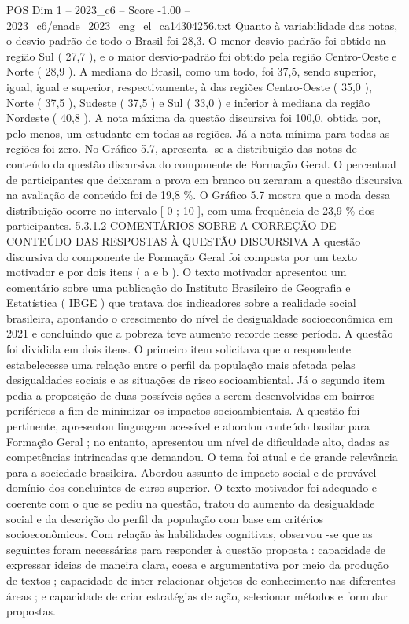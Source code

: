\begin{textsample}{POS Dim 1 – 2023\_c6 – Score -1.00 – 2023\_c6/enade\_2023\_eng\_el\_ca14304256.txt}
Quanto à variabilidade das notas, o desvio-padrão de todo o Brasil foi 28,3.
O menor desvio-padrão foi obtido na região Sul ( 27,7 ), e o maior desvio-padrão foi obtido pela região Centro-Oeste e Norte ( 28,9 ).
A mediana do Brasil, como um todo, foi 37,5, sendo superior, igual, igual e superior, respectivamente, à das regiões Centro-Oeste ( 35,0 ), Norte ( 37,5 ), Sudeste ( 37,5 ) e Sul ( 33,0 ) e inferior à mediana da região Nordeste ( 40,8 ).
A nota máxima da questão discursiva foi 100,0, obtida por, pelo menos, um estudante em todas as regiões.
Já a nota mínima para todas as regiões foi zero.
No Gráfico 5.7, apresenta -se a distribuição das notas de conteúdo da questão discursiva do componente de Formação Geral.
O percentual de participantes que deixaram a prova em branco ou zeraram a questão discursiva na avaliação de conteúdo foi de 19,8 \%.
O Gráfico 5.7 mostra que a moda dessa distribuição ocorre no intervalo [ 0 ; 10 ], com uma frequência de 23,9 \% dos participantes. 5.3.1.2 COMENTÁRIOS SOBRE A CORREÇÃO DE CONTEÚDO DAS RESPOSTAS À QUESTÃO DISCURSIVA A questão discursiva do componente de Formação Geral foi composta por um texto motivador e por dois itens ( a e b ).
O texto motivador apresentou um comentário sobre uma publicação do Instituto Brasileiro de Geografia e Estatística ( IBGE ) que tratava dos indicadores sobre a realidade social brasileira, apontando o crescimento do nível de desigualdade socioeconômica em 2021 e concluindo que a pobreza teve aumento recorde nesse período.
A questão foi dividida em dois itens.
O primeiro item solicitava que o respondente estabelecesse uma relação entre o perfil da população mais afetada pelas desigualdades sociais e as situações de risco socioambiental.
Já o segundo item pedia a proposição de duas possíveis ações a serem desenvolvidas em bairros periféricos a fim de minimizar os impactos socioambientais.
A questão foi pertinente, apresentou linguagem acessível e abordou conteúdo basilar para Formação Geral ; no entanto, apresentou um nível de dificuldade alto, dadas as competências intrincadas que demandou.
O tema foi atual e de grande relevância para a sociedade brasileira.
Abordou assunto de impacto social e de provável domínio dos concluintes de curso superior.
O texto motivador foi adequado e coerente com o que se pediu na questão, tratou do aumento da desigualdade social e da descrição do perfil da população com base em critérios socioeconômicos.
Com relação às habilidades cognitivas, observou -se que as seguintes foram necessárias para responder à questão proposta : capacidade de expressar ideias de maneira clara, coesa e argumentativa por meio da produção de textos ; capacidade de inter-relacionar objetos de conhecimento nas diferentes áreas ; e capacidade de criar estratégias de ação, selecionar métodos e formular propostas.

\end{textsample}

